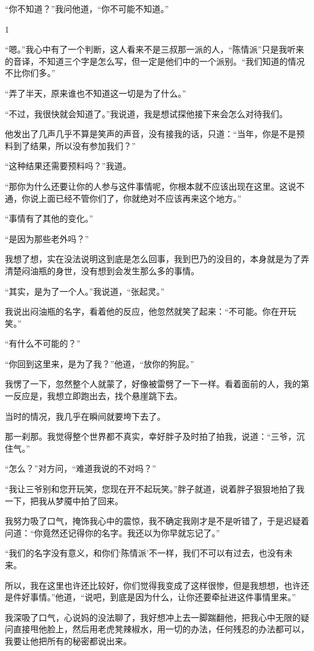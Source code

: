 “你不知道？”我问他道，“你不可能不知道。”

1

“嗯。”我心中有了一个判断，这人看来不是三叔那一派的人，“陈情派”只是我听来的音译，不知道三个字是怎么写，但一定是他们中的一个派别。“我们知道的情况不比你们多。”

“弄了半天，原来谁也不知道这一切是为了什么。”

“不过，我很快就会知道了。”我说道，我是想试探他接下来会怎么对待我们。

他发出了几声几乎不算是笑声的声音，没有接我的话，只道：“当年，你是不是预料到了结果，所以没有参加我们？”

“这种结果还需要预料吗？”我道。

“那你为什么还要让你的人参与这件事情呢，你根本就不应该出现在这里。这说不通，你说上面已经不管你们了，你就绝对不应该再来这个地方。”

“事情有了其他的变化。”

“是因为那些老外吗？”

我想了想，实在没法说明这到底是怎么回事，我到巴乃的没目的，本身就是为了弄清楚闷油瓶的身世，没有想到会发生那么多的事情。

“其实，是为了一个人。”我说道，“张起灵。”

我说出闷油瓶的名字，看着他的反应，他忽然就笑了起来：“不可能。你在开玩笑。”

“有什么不可能的？”

“你回到这里来，是为了我？”他道，“放你的狗屁。”

我愣了一下，忽然整个人就蒙了，好像被雷劈了一下一样。看着面前的人，我的第一反应是，我想立即跑出去，找个悬崖跳下去。

当时的情况，我几乎在瞬间就要垮下去了。

那一刹那。我觉得整个世界都不真实，幸好胖子及时拍了拍我，说道：“三爷，沉住气。”

“怎么？”对方问，“难道我说的不对吗？”

“我让三爷别和您开玩笑，您现在开不起玩笑。”胖子就道，说着胖子狠狠地拍了我一下，把我从梦魇中拍了回来。

我努力吸了口气，掩饰我心中的震惊，我不确定我刚才是不是听错了，于是迟疑着问道：“你竟然还记得你的名字。我还以为你早就忘记了。”

“我们的名字没有意义，和你们‘陈情派’不一样，我们不可以有过去，也没有未来。

所以，我在这里也许还比较好，你们觉得我变成了这样很惨，但是我想想，也许还是件好事情。”他道，“说吧，到底是因为什么，让你还要牵扯进这件事情里来。”

我深吸了口气，心说妈的没法聊了，我好想冲上去一脚踹翻他，把我心中无限的疑问直接甩他脸上，然后用老虎凳辣椒水，用一切的办法，任何残忍的办法都可以，我要让他把所有的秘密都说出来。

